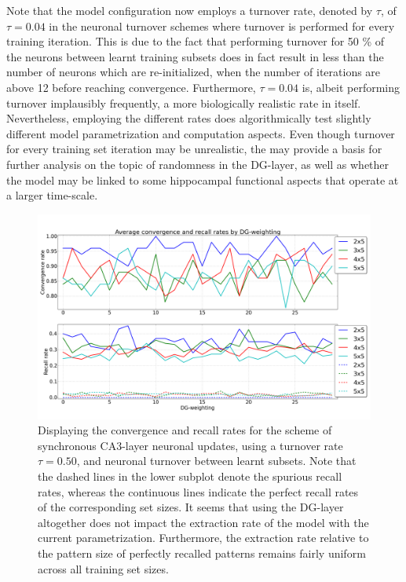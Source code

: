 Note that the model configuration now employs a turnover rate, denoted by $\tau$, of $\tau=0.04$ in the neuronal turnover schemes where turnover is performed for every training iteration. This is due to the fact that performing turnover for 50 \% of the neurons between learnt training subsets does in fact result in less than the number of neurons which are re-initialized, when the number of iterations are above 12 before reaching convergence. Furthermore, $\tau=0.04$ is, albeit performing turnover implausibly frequently, a more biologically realistic rate in itself. Nevertheless, employing the different rates does algorithmically test slightly different model parametrization and computation aspects. Even though turnover for every training set iteration may be unrealistic, the may provide a basis for further analysis on the topic of randomness in the DG-layer, as well as whether the model may be linked to some hippocampal functional aspects that operate at a larger time-scale.


\begin{figure}
    \centering
    \includegraphics[width=13cm]{fig/DGWs/sync_tm0_50}
    \caption{Displaying the convergence and recall rates for the scheme of synchronous CA3-layer neuronal updates, using a turnover rate $\tau=0.50$, and neuronal turnover between learnt subsets. Note that the dashed lines in the lower subplot denote the spurious recall rates, whereas the continuous lines indicate the perfect recall rates of the corresponding set sizes. It seems that using the DG-layer altogether does not impact the extraction rate of the model with the current parametrization. Furthermore, the extraction rate relative to the pattern size of perfectly recalled patterns remains fairly uniform across all training set sizes.}
    \label{fig:sync_tm0_50}
\end{figure}

